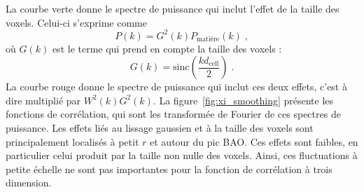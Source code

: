   La courbe verte donne le spectre de puissance qui inclut l'effet de la taille des voxels. Celui-ci s'exprime comme
  \begin{equation}
    P(k) =   G^2(k) P_{\mathrm{matière}}(k) \; ,
  \end{equation}
  où $G(k)$ est le terme qui prend en compte la taille des voxels :
  \begin{equation}
    \label{eq:effet_reso}
    G(k) = \mathrm{sinc}\left(\frac{k d_{\mathrm{cell}}}{2}\right)  \; .
  \end{equation}
  La courbe rouge donne le spectre de puissance qui inclut ces deux effets, c'est à dire multiplié par $W^2(k)G^2(k)$.
  La figure~\ref{fig:xi_smoothing} présente les fonctions de corrélation, qui sont les transformée de Fourier de ces spectres de puissance.
  Les effets liés au lissage gaussien et à la taille des voxels sont principalement localisés à petit $r$ et autour du pic BAO. Ces effets sont faibles, en particulier celui produit par la taille non nulle des voxels.
  Ainsi, ces fluctuations à petite échelle ne sont pas importantes pour la fonction de corrélation à trois dimension.

